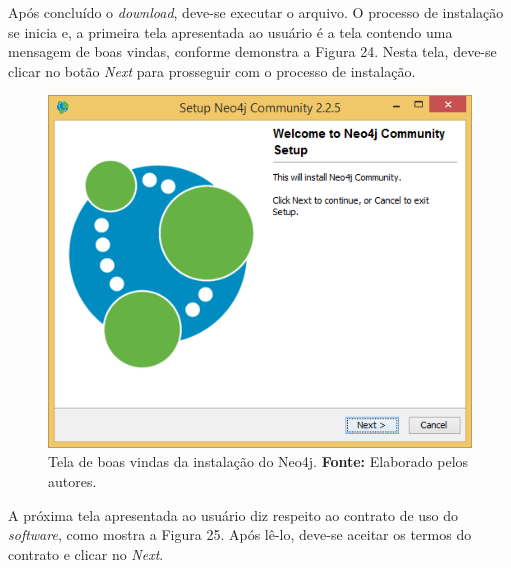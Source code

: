 \par Após concluído o \textit{download}, deve-se executar o arquivo. O processo de instalação se inicia e, a primeira tela apresentada ao usuário é a tela contendo uma mensagem de boas vindas, conforme demonstra a Figura 24. Nesta tela, deve-se clicar no botão \textit{Next} para prosseguir com o processo de instalação.

\begin{figure}[h!]
	\centerline{\includegraphics[scale=0.4]{./imagens/neo4j-install-step1.png}}
	\caption[Tela de boas vindas da instalação do Neo4j]
	{Tela de boas vindas da instalação do Neo4j. \textbf{Fonte:} Elaborado pelos autores.}
	\label{fig:exemplo1}
\end{figure}

\par A próxima tela apresentada ao usuário diz respeito ao contrato de uso do \textit{software}, como mostra a Figura 25. Após lê-lo, deve-se aceitar os termos do contrato e clicar no \textit{Next}.

